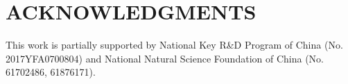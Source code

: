 \documentclass[a4paper, 10pt, conference]{ieeeconf}      \usepackage{FG2020}
\begin{document}
\section{ACKNOWLEDGMENTS}
This work is partially supported by National Key R\&D Program of China (No. 2017YFA0700804) and National Natural Science Foundation of China (No. 61702486, 61876171).







\end{document}
